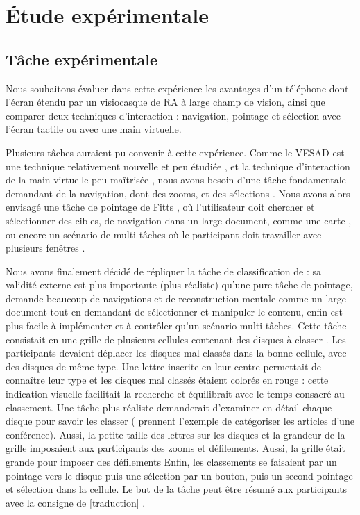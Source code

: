 \chapter{Étude expérimentale}
\label{ch:experiment}

\section{Tâche expérimentale}
\label{sec:experiment_task}

Nous souhaitons évaluer dans cette expérience les avantages d'un téléphone dont l'écran étendu par un visiocasque de RA à large champ de vision, ainsi que comparer deux techniques d'interaction : navigation, pointage et sélection avec l'écran tactile ou avec une main virtuelle.

Plusieurs tâches auraient pu convenir à cette expérience. Comme le VESAD est une technique relativement nouvelle et peu étudiée \citep{Grubert2015}, et la technique d'interaction de la main virtuelle peu maîtrisée \citep{Argelaguet2013, Piumsomboon2013}, nous avons besoin d'une tâche fondamentale demandant de la navigation, dont des zooms, et des sélections \citep{Bowman2004}. Nous avons alors envisagé une tâche de pointage de Fitts \citep{Soukoreff2004, Berge2014}, où l'utilisateur doit chercher et sélectionner des cibles, de navigation dans un large document, comme une carte \citep{Baudisch2002, Raedle2014}, ou encore un scénario de multi-tâches où le participant doit travailler avec plusieurs fenêtres \citep{Czerwinski2003, Ens2014}.

Nous avons finalement décidé de répliquer la tâche de classification de \cite{Liu2014} : sa validité externe est plus importante (plus réaliste) qu'une pure tâche de pointage, demande beaucoup de navigations et de reconstruction mentale comme un large document tout en demandant de sélectionner et manipuler le contenu, enfin est plus facile à implémenter et à contrôler qu'un scénario multi-tâches. Cette tâche consistait en une grille de plusieurs cellules contenant des disques à classer . Les participants devaient déplacer les disques mal classés dans la bonne cellule, avec des disques de même type. Une lettre inscrite en leur centre permettait de connaître leur type et les disques mal classés étaient colorés en rouge : cette indication visuelle facilitait la recherche et équilibrait avec le temps consacré au classement. Une tâche plus réaliste demanderait d'examiner en détail chaque disque pour savoir les classer (\citeauthor{Liu2014} prennent l'exemple de catégoriser les articles d'une conférence). Aussi, la petite taille des lettres sur les disques et la grandeur de la grille imposaient aux participants des zooms et défilements. Aussi, la grille était grande pour imposer des défilements Enfin, les classements se faisaient par un pointage vers le disque puis une sélection par un bouton, puis un second pointage et sélection dans la cellule. Le but de la tâche peut être résumé aux participants avec la consigne de [traduction]  \citep{Liu2014}.

